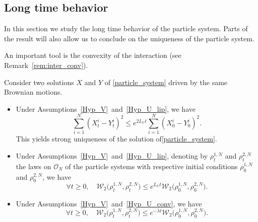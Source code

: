 \subsection{Long time behavior}\label{sec_long_time}

In this section we study the long time behavior of the particle system. Parts of the result will also allow us to conclude on the uniqueness of the particle system.

An important tool is the convexity of the interaction (see Remark~\ref{rem:inter_conv}).

\begin{theorem}\label{long_time_beha}
Consider two solutions $X$ and $Y$ of \eqref{particle_system} driven by the same Brownian motions.
\begin{itemize}
\item Under Assumptions~\ref{Hyp_V}~and~\ref{Hyp_U_lip}, we have
\begin{equation}\label{unicite_en_vrai}
\sum_{i=1}^N(X^i_t-Y^i_t)^2\leq e^{2L_U t}\sum_{i=1}^N(X^i_0-Y^i_0)^2.
\end{equation}
This yields strong uniqueness of the solution of\eqref{particle_system}.
\item Under Assumptions~\ref{Hyp_V}~and~\ref{Hyp_U_lip}, denoting by $\rho^{1,N}_t$ and $\rho^{2,N}_t$ the laws on $\mathcal{O}_N$ of the particle systems with respective initial conditions $\rho^{1,N}_0$ and $\rho^{2,N}_0$, we have
\begin{equation}\label{unicite}
\forall t\geq0,\quad \mathcal{W}_2\bigl(\rho^{1,N}_t,\rho^{2,N}_t\bigr)\leq e^{L_U t}\mathcal{W}_2\bigl(\rho^{1,N}_0,\rho^{2,N}_0\bigr).
\end{equation}
\item Under Assumptions~\ref{Hyp_V}~and~\ref{Hyp_U_conv}, we have
\begin{equation}\label{long_time}
\forall t\geq0,\quad \mathcal{W}_2\bigl(\rho^{1,N}_t,\rho^{2,N}_t\bigr)\leq e^{-\lambda t}\mathcal{W}_2\bigl(\rho^{1,N}_0,\rho^{2,N}_0\bigr).
\end{equation}
\end{itemize}
\end{theorem}

